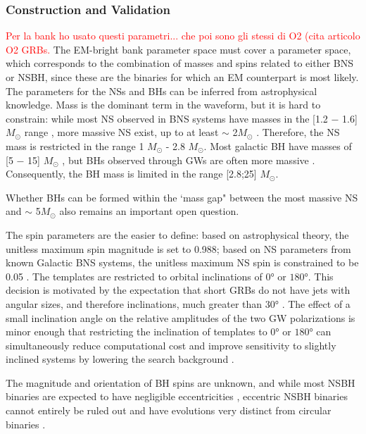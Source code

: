 \documentclass[binding=0.6cm, LaM]{sapthesis}
\newcommand{\fpg}[1]{\textcolor{red}{#1} }
\begin{document}
\subsubsection{Construction and Validation}
\label{subsec:construction_and_validation}

\fpg{Per la bank ho usato questi parametri... che poi sono gli stessi di O2 (cita articolo O2 GRBs.}
	The EM-bright bank parameter space must cover a parameter space,
        which corresponds to the combination of masses and spins related to either BNS or NSBH,
        since these are the binaries for which an EM counterpart is most likely.
        The parameters for the NSs and BHs can be inferred from astrophysical knowledge.
        Mass is the dominant term in the waveform, but it is hard to constrain:
        while most NS observed in BNS systems have masses in the [1.2 − 1.6] $M_{\odot}$ range \cite{200},
        more massive NS exist, up to at least $\sim$ 2$M_{\odot}$  \cite{200}.
        Therefore, the NS mass is restricted in the range 1 $M_\odot$ - 2.8 $M_\odot$.
        Most galactic BH have masses of [5 − 15] $M_{\odot}$  \cite{195},
        but BHs observed through GWs are often more massive \cite{13}. \\
        Consequently, the BH mass is limited in the range [2.8;25] $M_\odot$.

        Whether BHs can be formed within the \lq mass gap" between the most massive NS
        and $\sim$ 5$M_{\odot}$ also remains an important open question.

        The spin parameters are the easier to define: based on astrophysical theory,
        the unitless maximum spin magnitude is set to 0.988;
        based on NS parameters from known Galactic BNS systems,
        the unitless maximum NS spin is constrained to be 0.05 \cite{136}.
        The templates are restricted to orbital inclinations of $\ang{0}$ or $\ang{180}$.
        This decision is motivated by the expectation that short GRBs do not have jets with angular sizes,
        and therefore inclinations, much greater than $\ang{30}$ \cite{136}.
        The effect of a small inclination angle on the relative amplitudes of the two GW polarizations
        is minor enough that restricting the inclination of templates to $\ang{0}$ or $\ang{180}$
        can simultaneously reduce computational cost and improve sensitivity to slightly inclined systems by lowering the search background \cite{136}.

        The magnitude and orientation of BH spins are unknown, and while most NSBH binaries
        are expected to have negligible eccentricities \cite{202},
        eccentric NSBH binaries cannot entirely be ruled out
        and have evolutions very distinct from circular binaries \cite{203}.
\end{document}
